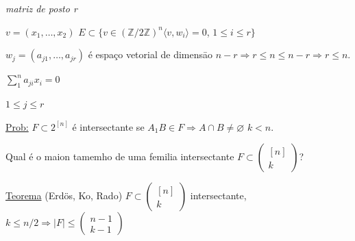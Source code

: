 \documentclass[a4paper,12pt]{article}
\theoremstyle{plain} %
\theoremstyle{definition} %
\theoremstyle{remark} %
\begin{document}
\begin{framed}
		\hspace{20ex} \textit{matriz de posto r}
		
		$v=(x_1,\dotso,x_2)$ \hspace{3em} $E\subset\{v\in (\mathds{Z}/2\mathds{Z})^n\langle v,w_i\rangle =0$, $1\leqslant i\leqslant r\}$
		
		$w_j=(a_{j1},\dotso,a_{jr})$ \hspace{2em} \'e espa\c{c}o vetorial de dimens\=ao $n-r\Rightarrow r\leqslant n\leqslant n-r\Rightarrow r\leqslant n$.
		
		$\sum\limits_1^n a_{ji}x_i=0$
		
		$1\leqslant j\leqslant r$
		\vspace{1ex}
	\end{framed}
	
	\vspace{2ex}\underline{Prob:} $F\subset 2^{[n]}$ \'e intersectante se $A_1B\in F\Rightarrow A\cap B\neq \varnothing$ $k<n$.
	
	Qual \'e o maion tamemho de uma femilia intersectante $F\subset \left(\begin{smallmatrix}
		[n]\\
		k
	\end{smallmatrix}\right)$?
	\vspace{1ex}
	
	\underline{Teorema} (Erd\"os, Ko, Rado) $F\subset\left(\begin{smallmatrix}
		[n]\\
		k
	\end{smallmatrix}\right)$ intersectante, $k\leqslant n/2\Rightarrow|F|\leqslant\left(\begin{smallmatrix}
		n-1\\
		k-1
	\end{smallmatrix}\right)$
	\vspace{1ex}
	
\end{document}
